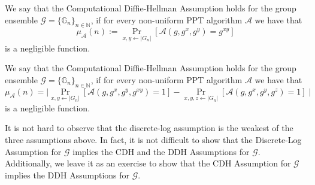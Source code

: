 \documentclass[12pt]{tufte-book}
\begin{document}
\begin{definition}\label{def:cdh}
We say that the Computational Diffie-Hellman Assumption holds for the group ensemble $\mathcal{G} =\{ \mathbb{G}_n\}_{n \in \mathbb{N}}$, if for every non-uniform PPT algorithm $\mathcal{A}$ we have that
\[\mu_\mathcal{A}(n) := \Pr_{x,y \leftarrow |G_n|}[\mathcal{A}(g,g^x,g^y) = g^{xy}]\]
is a negligible function.
\end{definition}

\begin{definition}\label{def:ddh}
We say that the Computational Diffie-Hellman Assumption holds for the group ensemble $\mathcal{G} =\{ \mathbb{G}_n\}_{n \in \mathbb{N}}$, if for every non-uniform PPT algorithm $\mathcal{A}$ we have that
\[\mu_\mathcal{A}(n) = \mid\Pr_{x,y \leftarrow |G_n|}[\mathcal{A}(g,g^x,g^y,g^{xy}) = 1] - \Pr_{x,y,z \leftarrow |G_n|}[\mathcal{A}(g,g^x,g^y,g^{z}) = 1]\mid\]
is a negligible function.
\end{definition}

It is not hard to observe that the discrete-log assumption is the weakest of the three assumptions above. In fact, it is not difficult to show that the Discrete-Log Assumption for $\mathcal{G}$ implies the CDH and the DDH Assumptions for $\mathcal{G}$.  Additionally, we leave it as an exercise to show that the CDH Assumption for $\mathcal{G}$ implies the  DDH Assumptions for $\mathcal{G}$.
\end{document}
